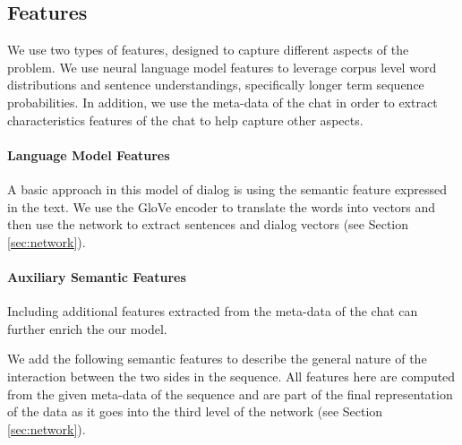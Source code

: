\subsection{Features}
We use two types of features, designed to capture
different aspects of the problem. We use neural 
language model features to leverage corpus
level word distributions and sentence understandings, 
specifically longer term
sequence probabilities. In addition, we use the meta-data of the chat in order to extract characteristics features of the chat 
to help capture other aspects.

\paragraph*{Language Model Features}
A basic approach in this model of dialog is 
using the semantic feature expressed in the text. 
We use the GloVe \cite{glove} encoder to translate the words 
into vectors and then use the network to extract sentences and 
dialog vectors (see Section \ref{sec:network}). 



\paragraph*{Auxiliary Semantic Features}\label{sec:semantic}
Including additional features 
extracted from the meta-data of the chat can further enrich the our model. 

We add the following semantic features 
to describe the general nature 
of the interaction between the two sides 
in the sequence. All features here 
are computed from the given meta-data of the sequence and 
are part of the final representation of the data as it goes into the 
third level of the network (see Section \ref{sec:network}). 

